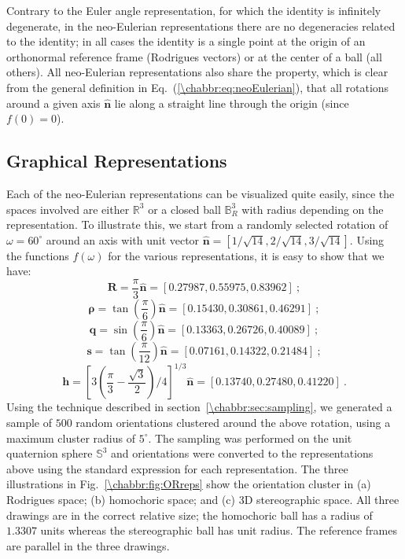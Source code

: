 \noindent Contrary to the Euler angle representation, for which the identity is infinitely degenerate, in the neo-Eulerian representations there are no degeneracies related to the identity; in all cases the identity is a single point at the origin of an orthonormal reference frame (Rodrigues vectors) or at the center of a ball (all others). All neo-Eulerian representations also share the property, which is clear from the general definition in Eq.~(\ref{\chabbr:eq:neoEulerian}), that all rotations around a given axis $\hat{\mathbf{n}}$ lie along a straight line through the origin (since $f(0)=0$).

\subsection{Graphical Representations}\label{\chabbr:ssec:visualization}

Each of the neo-Eulerian representations can be visualized quite easily, since the spaces involved are either $\mathbb{R}^3$ or a closed ball $\mathbb{B}^3_R$ with radius depending on the representation. To illustrate this, we start from a randomly selected rotation of $\omega=60^{\circ}$ around an axis with unit vector $\hat{\mathbf{n}}=[1/\sqrt{14},2/\sqrt{14},3/\sqrt{14}]$.  Using the functions $f(\omega)$ for the various representations, it is easy to show that we have:
\[
	\mathbf{R} = \frac{\pi}{3}\hat{\mathbf{n}} = \left[0.27987, 0.55975, 0.83962\right]\ ;
\]
\[
	\bm{\rho} = \tan(\frac{\pi}{6})\hat{\mathbf{n}} =\left[0.15430, 0.30861,  0.46291\right]\ ;
\]
\[
	\mathbf{q} = \sin(\frac{\pi}{6})\hat{\mathbf{n}} =  \left[0.13363, 0.26726, 0.40089\right]\ ;
\]
\[
	\mathbf{s} = \tan(\frac{\pi}{12})\hat{\mathbf{n}} = \left[0.07161, 0.14322,  0.21484\right]\ ;
\]
\[
	\mathbf{h} = [3(\frac{\pi}{3}-\frac{\sqrt{3}}{2})/4]^{1/3}\hat{\mathbf{n}} = \left[0.13740, 0.27480,  0.41220\right]\ .
\]
Using the  technique described in section~\ref{\chabbr:sec:sampling}, we generated a sample of $500$ random orientations clustered around the above rotation, using a maximum cluster radius of $5^{\circ}$.  The sampling was performed on the unit quaternion sphere $\mathbb{S}^3$ and orientations were converted to the representations above using the standard expression for each representation. The three illustrations in Fig.~\ref{\chabbr:fig:ORreps} show the orientation cluster in (a) Rodrigues space; (b) homochoric space; and (c) 3D stereographic space.  All three drawings are in the correct relative size; the homochoric ball has a radius of  $1.3307$ units whereas the stereographic ball has unit radius.  The reference frames are parallel in the three drawings.

